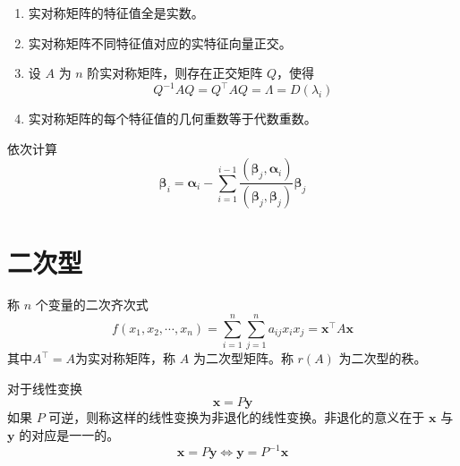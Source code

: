 \documentclass{ctexbook}
\begin{document}
\begin{proposition}[实对称矩阵的性质]
    \begin{enumerate}
        \item 实对称矩阵的特征值全是实数。
        \item 实对称矩阵不同特征值对应的实特征向量正交。
        \item 设 $A$ 为 $n$ 阶实对称矩阵，则存在正交矩阵 $Q$，使得
        \begin{equation}
            Q^{-1}AQ=Q^\top AQ=\Lambda=D(\lambda_i)
        \end{equation}
        \item 实对称矩阵的每个特征值的几何重数等于代数重数。
    \end{enumerate}
\end{proposition}

\begin{proposition}
    依次计算
    \begin{equation}
        \boldsymbol{\beta}_i=\boldsymbol{\alpha}_i-\sum_{i=1}^{i-1}\frac{(\boldsymbol{\beta}_j,\boldsymbol{\alpha}_i)}{(\boldsymbol{\beta}_j,\boldsymbol{\beta}_j)}\boldsymbol{\beta}_j
    \end{equation}
\end{proposition}

\chapter{二次型}

\begin{definition}[二次型]
    称 $n$ 个变量的二次齐次式
    \begin{equation}
        f(x_1,x_2,\cdots,x_n)=\sum_{i=1}^n\sum_{j=1}^n a_{ij}x_ix_j=\boldsymbol{x}^\top A\boldsymbol{x}
    \end{equation}
    其中$A^\top=A$为实对称矩阵，称 $A$ 为二次型矩阵。称 $r(A)$ 为二次型的秩。
\end{definition}

\begin{definition}[非退化线性变换]
    对于线性变换
    \begin{equation}
        \boldsymbol{x}=P\boldsymbol{y}
    \end{equation}
    如果 $P$ 可逆，则称这样的线性变换为非退化的线性变换。非退化的意义在于 $\boldsymbol{x}$ 与 $\boldsymbol{y}$ 的对应是一一的。
    \begin{equation}
        \boldsymbol{x}=P\boldsymbol{y} \Leftrightarrow \boldsymbol{y}=P^{-1}\boldsymbol{x}
    \end{equation}
\end{definition}
\end{document}
